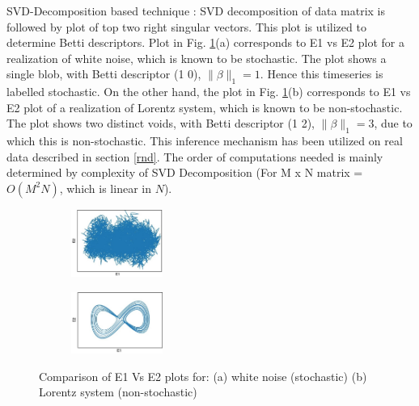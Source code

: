 \documentclass[journal]{IEEEtran}
\begin{document}
	SVD-Decomposition based technique : SVD decomposition of data matrix is followed by plot of top two right singular vectors. This plot is utilized to determine Betti descriptors. Plot in Fig. \ref{e1e2plots}(a) corresponds to E1 vs E2 plot for a realization of white noise, which is known to be stochastic. The plot shows a single blob, with Betti descriptor (1 0), $\|\beta\|_1 = 1$. Hence this timeseries is labelled stochastic. On the other hand, the plot in Fig. \ref{e1e2plots}(b) corresponds to E1 vs E2 plot of a realization of Lorentz system, which is known to be non-stochastic.  The plot shows two distinct voids, with Betti descriptor (1 2), $\|\beta\|_1 = 3$, due to which this is non-stochastic. This inference mechanism has been utilized on real data described in section \ref{rnd}.
	The order of computations needed is mainly determined by complexity of SVD Decomposition (For M x N matrix = $O(M^2N)$, which is linear in $N$).

%		
%		

\begin{figure}
	\centering
	
	\begin{subfigure}[]
		\centering
		\includegraphics[width=3cm]{svd_white_noise_crop.jpg}
	\end{subfigure}
	\begin{subfigure}[]
		\centering
		\includegraphics[width=3cm]{Lorenz_e1_vs_e2_2_2.JPG}
	\end{subfigure}
	\caption{Comparison of E1 Vs E2 plots for: (a) white noise (stochastic) (b) Lorentz system (non-stochastic)}
	\label{e1e2plots}
	\end{figure}
	
\end{document}
